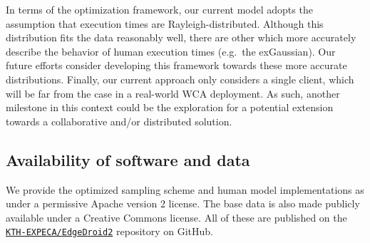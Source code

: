 In terms of the optimization framework, our current model adopts the assumption that execution times are Rayleigh-distributed.
Although this distribution fits the data reasonably well, there are other which more accurately describe the behavior of human execution times (e.g.\ the \gls{exGaussian}).
Our future efforts consider developing this framework towards these more accurate distributions.
Finally, our current approach only considers a single client, which will be far from the case in a real-world \gls{WCA} deployment.
As such, another milestone in this context could be the exploration for a potential extension towards a collaborative and/or distributed solution.

\subsection*{Availability of software and data}\label{ssec:model:obtaining}

We provide the optimized sampling scheme and human model implementations as  under a permissive Apache version 2 license.
The base data is also made publicly available under a Creative Commons license.
All of these are published on the \href{https://github.com/KTH-EXPECA/EdgeDroid2}{\texttt{KTH-EXPECA/EdgeDroid2}} repository on GitHub.

